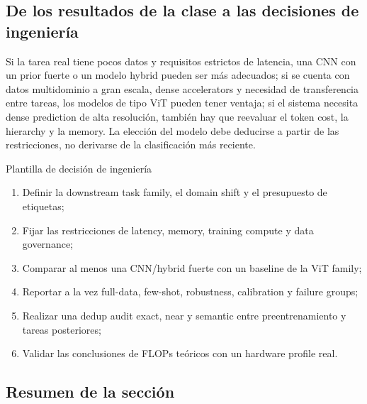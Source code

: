 \documentclass[a4paper]{article}
\begin{document}

\subsection{De los resultados de la clase a las decisiones de ingeniería}

Si la tarea real tiene pocos datos y requisitos estrictos de latencia, una CNN con un prior fuerte o un modelo hybrid pueden ser más adecuados; si se cuenta con datos multidominio a gran escala, dense accelerators y necesidad de transferencia entre tareas, los modelos de tipo ViT pueden tener ventaja; si el sistema necesita dense prediction de alta resolución, también hay que reevaluar el token cost, la hierarchy y la memory. La elección del modelo debe deducirse a partir de las restricciones, no derivarse de la clasificación más reciente.

\begin{importantbox}{Plantilla de decisión de ingeniería}
\begin{enumerate}
  \item Definir la downstream task family, el domain shift y el presupuesto de etiquetas;
  \item Fijar las restricciones de latency, memory, training compute y data governance;
  \item Comparar al menos una CNN/hybrid fuerte con un baseline de la ViT family;
  \item Reportar a la vez full-data, few-shot, robustness, calibration y failure groups;
  \item Realizar una dedup audit exact, near y semantic entre preentrenamiento y tareas posteriores;
  \item Validar las conclusiones de FLOPs teóricos con un hardware profile real.
\end{enumerate}
\end{importantbox}

\subsection{Resumen de la sección}
\end{document}
